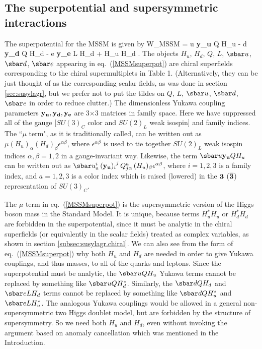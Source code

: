 \subsection{The superpotential and supersymmetric
interactions}\label{subsec:mssm.superpotential}

The superpotential for the MSSM is given by
\beq
W_{\rm MSSM} =
\sbar u {\bf y_u} Q H_u -
\sbar d {\bf y_d} Q H_d -
\sbar e {\bf y_e} L H_d +
\mu H_u H_d \> .
\label{MSSMsuperpot}
\eeq
The objects $H_u$, $H_d$, $Q$, $L$, $\sbar u$, $\sbar d$, $\sbar e$
appearing in eq.~(\ref{MSSMsuperpot}) are chiral superfields corresponding
to the chiral supermultiplets in Table 1. (Alternatively, they can be
just thought of as the corresponding scalar fields, as was done in
section \ref{sec:susylagr}, but we prefer not to put the tildes on
$Q$, $L$, $\sbar u$, $\sbar d$, $\sbar e$
in order to reduce clutter.)
The dimensionless Yukawa coupling parameters
${\bf y_u}, {\bf y_d}, {\bf y_e}$
are 3$\times 3$ matrices in family space.
Here we have suppressed all of the gauge [$SU(3)_C$ color and
$SU(2)_L$ weak isospin]  and family indices.
The ``$\mu$ term", as it is traditionally called, can be written out as
$\mu (H_u)_\alpha (H_d)_\beta \epsilon^{\alpha\beta}$, where
$\epsilon^{\alpha\beta}$ is used to tie together
$SU(2)_L$ weak isospin indices $\alpha,\beta=1,2$ in a gauge-invariant way.
Likewise, the term $\sbar u {\bf y_u} Q H_u$ can be written out
as $\sbar u_{a}^{i}\, {({\bf y_u})_i}^j\, Q^{a}_{j\alpha}\, (H_u)_\beta
\epsilon^{\alpha \beta}$, where
$i=1,2,3$ is a family index, and
$a=1,2,3$ is a
color index which is raised (lowered) in the $\bf 3$ ($\bf \overline 3$)
representation of $SU(3)_C$.

The $\mu$ term in eq.~(\ref{MSSMsuperpot}) is the supersymmetric version
of the Higgs boson mass in the Standard Model. It is unique,
because terms $H_u^* H_u$ or $H_d^* H_d$ are forbidden in the
superpotential, since it must be analytic in the chiral
superfields (or equivalently in the scalar fields) treated as
complex variables, as shown in section \ref{subsec:susylagr.chiral}.
We can also see from the form of eq.~(\ref{MSSMsuperpot}) why both $H_u$
and $H_d$ are needed in order to give Yukawa couplings, and thus masses,
to all of the quarks and
leptons. Since the superpotential must be analytic,
the $\sbar u Q H_u $ Yukawa terms
cannot be replaced by something like $\sbar u Q H_d^*$.
Similarly, the $\sbar d Q H_d$ and $\sbar e L H_d$ terms cannot be
replaced by
something like $\sbar d Q H_u^*$ and $\sbar e L H_u^*$. The analogous
Yukawa couplings would be allowed in a general non-supersymmetric two
Higgs doublet model,
but are forbidden by the structure of supersymmetry. So we need both
$H_u$ and $H_d$, even without invoking the argument based on anomaly
cancellation
which
was mentioned in the Introduction.

